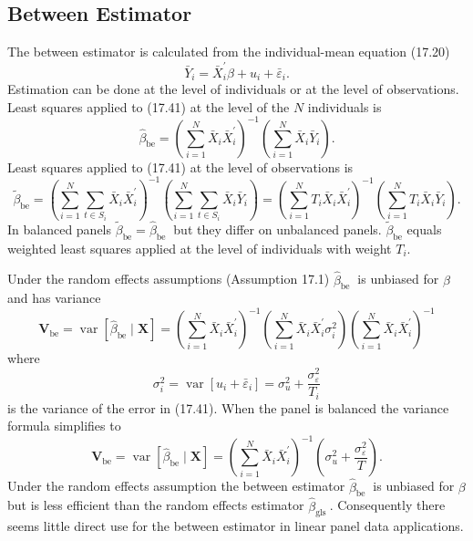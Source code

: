 \documentclass[10pt]{article}
\begin{document}
\subsection{Between Estimator}
The between estimator is calculated from the individual-mean equation (17.20)
$$
\bar{Y}_{i}=\bar{X}_{i}^{\prime} \beta+u_{i}+\bar{\varepsilon}_{i} .
$$
Estimation can be done at the level of individuals or at the level of observations. Least squares applied to (17.41) at the level of the $N$ individuals is
$$
\widehat{\beta}_{\mathrm{be}}=\left(\sum_{i=1}^{N} \bar{X}_{i} \bar{X}_{i}^{\prime}\right)^{-1}\left(\sum_{i=1}^{N} \bar{X}_{i} \bar{Y}_{i}\right) .
$$
Least squares applied to (17.41) at the level of observations is
$$
\widetilde{\beta}_{\mathrm{be}}=\left(\sum_{i=1}^{N} \sum_{t \in S_{i}} \bar{X}_{i} \bar{X}_{i}^{\prime}\right)^{-1}\left(\sum_{i=1}^{N} \sum_{t \in S_{i}} \bar{X}_{i} \bar{Y}_{i}\right)=\left(\sum_{i=1}^{N} T_{i} \bar{X}_{i} \bar{X}_{i}^{\prime}\right)^{-1}\left(\sum_{i=1}^{N} T_{i} \bar{X}_{i} \bar{Y}_{i}\right) .
$$
In balanced panels $\widetilde{\beta}_{\mathrm{be}}=\widehat{\beta}_{\text {be }}$ but they differ on unbalanced panels. $\widetilde{\beta}_{\mathrm{be}}$ equals weighted least squares applied at the level of individuals with weight $T_{i}$.

Under the random effects assumptions (Assumption 17.1) $\widehat{\beta}_{\text {be }}$ is unbiased for $\beta$ and has variance
$$
\boldsymbol{V}_{\mathrm{be}}=\operatorname{var}\left[\widehat{\beta}_{\mathrm{be}} \mid \boldsymbol{X}\right]=\left(\sum_{i=1}^{N} \bar{X}_{i} \bar{X}_{i}^{\prime}\right)^{-1}\left(\sum_{i=1}^{N} \bar{X}_{i} \bar{X}_{i}^{\prime} \sigma_{i}^{2}\right)\left(\sum_{i=1}^{N} \bar{X}_{i} \bar{X}_{i}^{\prime}\right)^{-1}
$$
where
$$
\sigma_{i}^{2}=\operatorname{var}\left[u_{i}+\bar{\varepsilon}_{i}\right]=\sigma_{u}^{2}+\frac{\sigma_{\varepsilon}^{2}}{T_{i}}
$$
is the variance of the error in (17.41). When the panel is balanced the variance formula simplifies to
$$
\boldsymbol{V}_{\mathrm{be}}=\operatorname{var}\left[\widehat{\beta}_{\mathrm{be}} \mid \boldsymbol{X}\right]=\left(\sum_{i=1}^{N} \bar{X}_{i} \bar{X}_{i}^{\prime}\right)^{-1}\left(\sigma_{u}^{2}+\frac{\sigma_{\varepsilon}^{2}}{T}\right) .
$$
Under the random effects assumption the between estimator $\widehat{\beta}_{\text {be }}$ is unbiased for $\beta$ but is less efficient than the random effects estimator $\widehat{\beta}_{\text {gls }}$. Consequently there seems little direct use for the between estimator in linear panel data applications.
\end{document}
